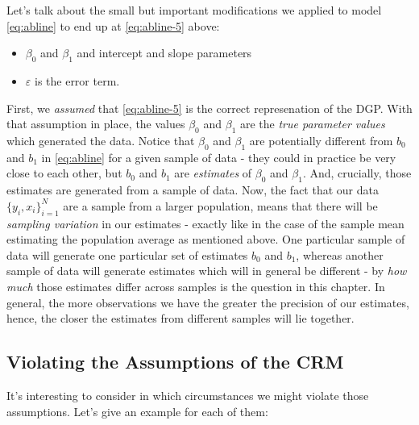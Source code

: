 \documentclass[]{book}
\providecommand{\tightlist}{%
  \setlength{\itemsep}{0pt}\setlength{\parskip}{0pt}}
\begin{document}
Let's talk about the small but important modifications we applied to
model \eqref{eq:abline} to end up at \eqref{eq:abline-5} above:

\begin{itemize}
\tightlist
\item
  \(\beta_0\) and \(\beta_1\) and intercept and slope parameters
\item
  \(\varepsilon\) is the error term.
\end{itemize}

First, we \emph{assumed} that \eqref{eq:abline-5} is the correct
represenation of the DGP. With that assumption in place, the values
\(\beta_0\) and \(\beta_1\) are the \emph{true parameter values} which
generated the data. Notice that \(\beta_0\) and \(\beta_1\) are
potentially different from \(b_0\) and \(b_1\) in \eqref{eq:abline} for a
given sample of data - they could in practice be very close to each
other, but \(b_0\) and \(b_1\) are \emph{estimates} of \(\beta_0\) and
\(\beta_1\). And, crucially, those estimates are generated from a sample
of data. Now, the fact that our data \(\{y_i,x_i\}_{i=1}^N\) are a
sample from a larger population, means that there will be \emph{sampling
variation} in our estimates - exactly like in the case of the sample
mean estimating the population average as mentioned above. One
particular sample of data will generate one particular set of estimates
\(b_0\) and \(b_1\), whereas another sample of data will generate
estimates which will in general be different - by \emph{how much} those
estimates differ across samples is the question in this chapter. In
general, the more observations we have the greater the precision of our
estimates, hence, the closer the estimates from different samples will
lie together.

\subsection{Violating the Assumptions of the
CRM}\label{violating-the-assumptions-of-the-crm}

It's interesting to consider in which circumstances we might violate
those assumptions. Let's give an example for each of them:
\end{document}
